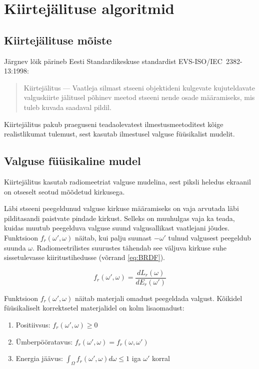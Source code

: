 \documentclass[a4paper,12pt]{report}
\begin{document}
\chapter{Kiirtejälituse algoritmid}
\section{Kiirtejälituse mõiste}
Järgnev lõik pärineb Eesti Standardikeskuse standardist EVS-ISO/IEC~2382-13:1998:
\begin{quote}
Kiirtejälitus --- Vaatleja silmast stseeni objektideni kulgevate
kujuteldavate valguskiirte jälitusel põhinev meetod stseeni nende osade
määramiseks, mis tuleb kuvada saadaval pildil.\cite{ISO:2382-13}
\end{quote}

Kiirtejälitus pakub praeguseni teadaolevatest ilmestusmeetoditest kõige
realistlikumat tulemust, sest kasutab ilmestusel valguse füüsikalist
mudelit.


\section{Valguse füüsikaline mudel}
Kiirtejälitus kasutab radiomeetriat valguse mudelina, sest piksli heledus
ekraanil on otseselt seotud mõõdetud kirkusega.

Läbi stseeni peegeldunud valguse kirkuse määramiseks on vaja arvutada
läbi pildi\-tasandi paistvate pindade kirkust. Selleks on muuhulgas vaja
ka teada, kuidas muutub peegelduva valguse suund valgusallikast vaatlejani
jõudes. Funktsioon \(f_r(\omega', \omega)\) näitab, kui palju suunast
\(-\omega'\) tulnud valgusest peegeldub suunda \(\omega\). Radiomeetrilistes
suurustes tähendab see väljuva kirkuse suhe sissetulevasse kiiritustihedusse
(võrrand \ref{eq:BRDF}).

\begin{equation} \label{eq:BRDF}
f_r(\omega', \omega) = \frac{dL_r(\omega)}{dE_r(\omega')}
\end{equation}

Funktsioon \(f_r(\omega', \omega)\) näitab materjali omadust peegeldada
valgust. Kõikidel füü\-si\-ka\-li\-selt korrektsetel materjalidel on kolm
lisaomadust:

\begin{enumerate}
\item Positiivsus: \(f_r(\omega', \omega) \geq 0 \)
\item Ümberpööratavus: \(f_r(\omega', \omega) = f_r(\omega, \omega')\)
\item Energia jäävus: \(\int_\Omega f_r(\omega', \omega) d\omega \leq 1\) iga \(\omega'\) korral
\end{enumerate}
\end{document}
